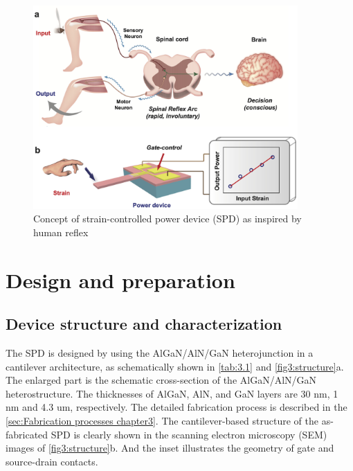 \begin{figure}[H] 
\centering    
\includegraphics[width=0.9\textwidth]{ch3_concept}
\caption[Concept of strain-controlled power device (SPD) as inspired by human reflex]{Concept of strain-controlled power device (SPD) as inspired by human reflex}
\label{fig3:concept}
\end{figure}

\section{Design and preparation}
\label{sec:Design and preparation chapter2}

\subsection{Device structure and characterization}
\label{sec:Device structure and characterization chapter2}

The SPD  is designed by using the AlGaN/AlN/GaN heterojunction  in a cantilever  architecture, as schematically shown in \autoref{tab:3.1} and \autoref{fig3:structure}a. The enlarged part is the schematic cross-section of the AlGaN/AlN/GaN heterostructure. The thicknesses of AlGaN, AlN, and GaN layers are 30 \unit{nm}, 1 \unit{nm} and 4.3 \unit{um}, respectively. The detailed fabrication process  is described in the \autoref{sec:Fabrication processes chapter3}. The cantilever-based  structure of the as-fabricated SPD  is clearly shown in the scanning electron microscopy (SEM)  images of \autoref{fig3:structure}b. And the inset illustrates the geometry of gate and source-drain contacts. 

